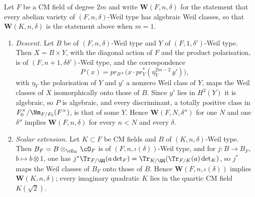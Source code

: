 \begin{proposition}\label{prop:descent}
Let $F$ be a CM field of degree $2m$ and write $\mathbf{W}(F,n,\delta)$ for
the statement that every abelian variety of $(F,n,\delta)$-Weil type has
algebraic Weil classes, so that $\mathbf{W}(K,n,\delta)$ is the statement
above when $m=1$.
\begin{enumerate}[label=\textup{(\roman*)},leftmargin=2.6em]
\item \emph{Descent.} Let $B$ be of $(F,n,\delta)$-Weil type and $Y$ of
  $(F,1,\delta')$-Weil type. Then $X=B\times Y$, with the diagonal action of
  $F$ and the product polarisation, is of $(F,n+1,\delta\delta')$-Weil type,
  and the correspondence
  \[
    P(x)=pr_{B*}\bigl(x\cdot pr_{Y}^{*}(\eta_{Y}^{2m-2}\,y')\bigr),
  \]
  with $\eta_{Y}$ the polarisation of $Y$ and $y'$ a nonzero Weil class of
  $Y$, maps the Weil classes of $X$ isomorphically onto those of $B$. Since
  $y'$ lies in $H^{2}(Y)$ it is algebraic, so $P$ is algebraic, and every
  discriminant, a totally positive class in
  $F_{0}^{\times}/\Nm_{F/F_{0}}(F^{\times})$, is that of some $Y$.
  Hence $\mathbf{W}(F,N,\delta'')$ for one $N$ and one $\delta''$ implies
  $\mathbf{W}(F,n,\delta)$ for every $n<N$ and every $\delta$.
\item \emph{Scalar extension.} Let $K\subset F$ be CM fields and $B$ of
  $(K,n,\delta)$-Weil type. Then $B_{F}=B\otimes_{\cO_{K}}\cO_{F}$ is of
  $(F,n,\iota(\delta))$-Weil type, and for $j\colon B\to B_{F}$,
  $b\mapsto b\otimes1$, one has
  $j^{*}\Tr_{F/\QQ}(a\det_{F})=\Tr_{K/\QQ}(\Tr_{F/K}(a)\det_{K})$, so $j^{*}$
  maps the Weil classes of $B_{F}$ onto those of $B$. Hence
  $\mathbf{W}(F,n,\iota(\delta))$ implies $\mathbf{W}(K,n,\delta)$; every
  imaginary quadratic $K$ lies in the quartic CM field $K(\sqrt2)$.
\end{enumerate}
\end{proposition}

